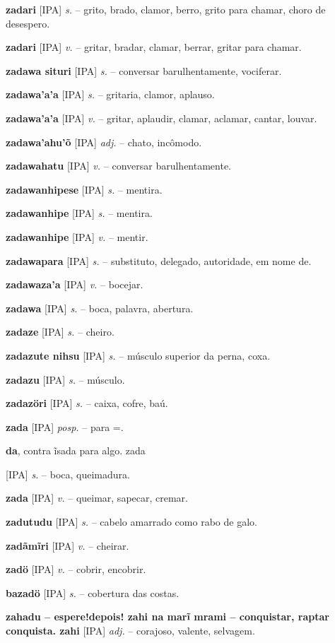 {{{{{{\textbf{zadari} [IPA] \textit{s.} -- grito, brado, clamor, berro, grito para chamar, choro de desespero.

\textbf{zadari} [IPA] \textit{v.} -- gritar, bradar, clamar, berrar, gritar para chamar.

\textbf{zadawa situri} [IPA] \textit{s.} -- conversar barulhentamente, vociferar.

\textbf{zadawa'a'a} [IPA] \textit{s.} -- gritaria, clamor, aplauso.

\textbf{zadawa'a'a} [IPA] \textit{v.} -- gritar, aplaudir, clamar, aclamar, cantar, louvar.

\textbf{zadawa'ahu'õ} [IPA] \textit{adj.} -- chato, incômodo.

\textbf{zadawahatu} [IPA] \textit{v.} -- conversar barulhentamente.

\textbf{zadawanhipese} [IPA] \textit{s.} -- mentira.

\textbf{zadawanhipe} [IPA] \textit{s.} -- mentira.

\textbf{zadawanhipe} [IPA] \textit{v.} -- mentir.

\textbf{zadawapara} [IPA] \textit{s.} -- substituto, delegado, autoridade, em nome de.

\textbf{zadawaza'a} [IPA] \textit{v.} -- bocejar.

\textbf{zadawa} [IPA] \textit{s.} -- boca, palavra, abertura.

\textbf{zadaze} [IPA] \textit{s.} -- cheiro.

\textbf{zadazute nihsu} [IPA] \textit{s.} -- músculo superior da perna, coxa.

\textbf{zadazu} [IPA] \textit{s.} -- músculo.

\textbf{zadazöri} [IPA] \textit{s.} -- caixa, cofre, baú.

\textbf{zada} [IPA] \textit{posp.} -- para =.

\textbf{da}, contra  ĩsada para algo. zada} [IPA] \textit{s.} -- boca, queimadura.

\textbf{zada} [IPA] \textit{v.} -- queimar, sapecar, cremar.

\textbf{zadutudu} [IPA] \textit{s.} -- cabelo amarrado como rabo de galo.

\textbf{zadãmĩri} [IPA] \textit{v.} -- cheirar.

\textbf{zadö} [IPA] \textit{v.} -- cobrir, encobrir.

\textbf{bazadö} [IPA] \textit{s.} -- cobertura das costas.

\textbf{zahadu -- espere!depois! zahi na marĩ mrami -- conquistar, raptar  conquista. zahi} [IPA] \textit{adj.} -- corajoso, valente, selvagem.

}}}}}
